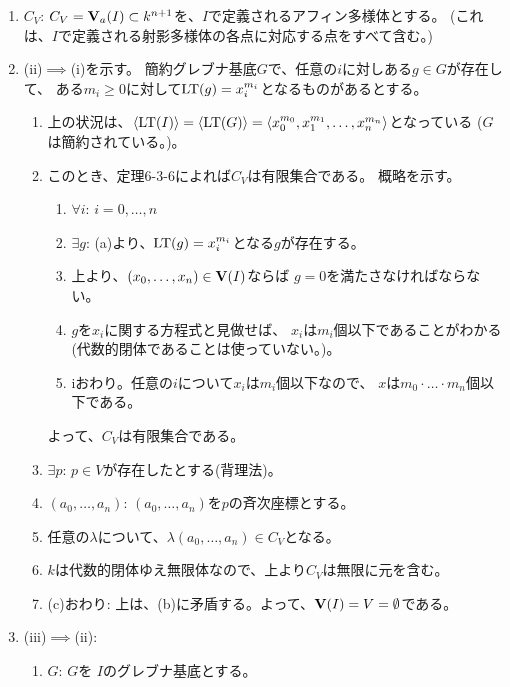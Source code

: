 \begin{myproof}
  \begin{enumerate}
    \item $C_V$:
    $C_V=\textbf V_a(I) \subset k^{n+1}$を、$I$で定義されるアフィン多様体とする。
    (これは、$I$で定義される射影多様体の各点に対応する点をすべて含む。)
    \item
    (ii)$\implies$(i)を示す。
    簡約グレブナ基底$G$で、任意の$i$に対しある$g\in G$が存在して、
    ある$m_i\ge 0$に対して${\rm LT}(g) = x_i^{m_i}$となるものがあるとする。
    \begin{enumerate}
      \item 上の状況は、$\left\langle {\rm LT}(I) \right\rangle = \left\langle {\rm LT}(G) \right\rangle = \left\langle x_0^{m_0}, x_1^{m_1},\dots,x_n^{m_n} \right\rangle$となっている
      ($G$は簡約されている。)。
      \item このとき、定理6-3-6によれば$C_V$は有限集合である。
      概略を示す。
      \begin{enumerate}
        \item $\forall i$: $i=0,\dots,n$
        \item $\exists g$: (a)より、${\rm LT}(g)=x_i^{m_i}$となる$g$が存在する。
        \item 上より、$(x_0,\dots,x_n) \in \textbf V(I)$ならば
        $g=0$を満たさなければならない。
        \item $g$を$x_i$に関する方程式と見做せば、
        $x_i$は$m_i$個以下であることがわかる(代数的閉体であることは使っていない。)。
        \item iおわり。任意の$i$について$x_i$は$m_i$個以下なので、
        $x$は$m_0\cdot \dots \cdot m_n$個以下である。
      \end{enumerate}
      よって、$C_V$は有限集合である。
      \item
      $\exists p$: $p\in V$が存在したとする(背理法)。
      \item
      $(a_0,\dots,a_n)$: $(a_0,\dots,a_n)$を$p$の斉次座標とする。
      \item
      任意の$\lambda$について、$\lambda(a_0,\dots,a_n) \in C_V$となる。
      \item
      $k$は代数的閉体ゆえ無限体なので、上より$C_V$は無限に元を含む。
      \item (c)おわり:
      上は、(b)に矛盾する。よって、$\textbf V(I)=V=\emptyset$である。
    \end{enumerate}
    \item (iii)$\implies$(ii):
    \begin{enumerate}
      \item $G$: $G$を $I$のグレブナ基底とする。

\end{enumerate}
\end{enumerate}
\end{myproof}
